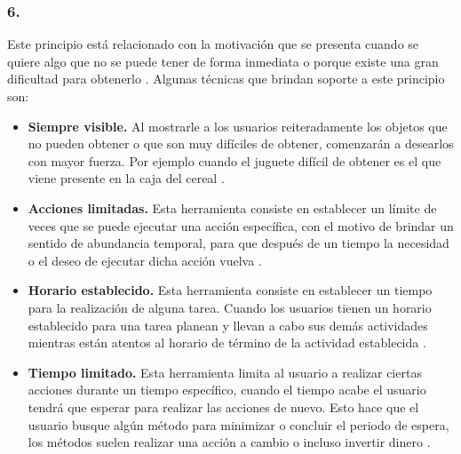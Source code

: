 \subsubsection{6. \principioVI} \label{subsec:principioVI}

 Este principio está relacionado con la motivación que se presenta cuando se quiere algo
 que no se puede tener de forma inmediata  o porque existe una gran dificultad para obtenerlo
 \cite[p. 233]{Octalysis}. Algunas técnicas que brindan soporte a este principio son:

    \begin{itemize}
    \item
    {\bf Siempre visible.} %
        Al mostrarle a los usuarios reiteradamente los objetos que no pueden
        obtener o que son muy difíciles de obtener, comenzarán a desearlos con
        mayor fuerza. Por ejemplo cuando el juguete difícil de obtener es el
        que viene presente en la caja del cereal \cite[p. 252]{Octalysis}.

    \item
    {\bf Acciones limitadas.} %
        Esta herramienta consiste en establecer un límite de veces que se puede ejecutar una
        acción específica, con el motivo de brindar un sentido de abundancia temporal, para
        que después de un tiempo la necesidad o el deseo de ejecutar dicha acción vuelva
        \cite[p. 256]{Octalysis}.

    \item
    {\bf Horario establecido.} %
        Esta herramienta consiste en establecer un tiempo para la realización de
        alguna tarea. Cuando los usuarios tienen un horario establecido para una
        tarea planean y llevan a cabo sus demás actividades mientras están atentos
        al horario de término de la actividad establecida \cite[p. 258]{Octalysis}.

    \item
    {\bf Tiempo limitado.} %
        Esta herramienta limita al usuario a realizar ciertas acciones durante un tiempo
        específico, cuando el tiempo acabe el usuario tendrá que esperar para realizar las
        acciones de nuevo. Esto hace que el usuario busque algún método para minimizar o concluir
        el periodo de espera, los métodos suelen realizar una acción a cambio o incluso invertir
        dinero \cite[p. 261]{Octalysis}.
    \end{itemize}

